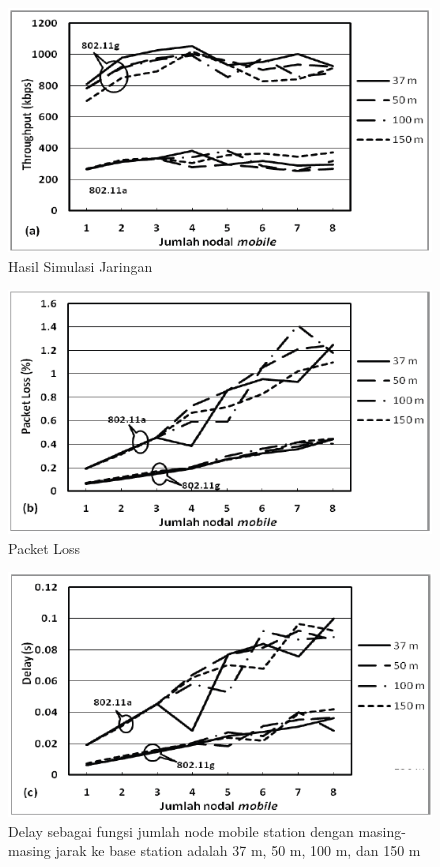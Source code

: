 \documentclass{jtetiproposalskripsi}
\begin{document}
\begin{figure}[ht!]
  \centering
    \includegraphics{gambar/2a}
    \caption{Hasil Simulasi Jaringan}
    \label{Hasil Simulasi Jaringan}
\end{figure}
\vspace{-0.5cm}
\begin{figure}[ht!]
  \centering
    \includegraphics{gambar/2b}
    \caption{Packet Loss}
    \label{Packet Loss}
\end{figure}
\vspace{-0.5cm}
\begin{figure}[ht!]
  \centering
    \includegraphics{gambar/2c}
    \caption{Delay sebagai fungsi jumlah node mobile station dengan masing-masing jarak ke base station adalah 37 m, 50 m, 100 m, dan 150 m}
    \label{Delay}
\end{figure}
\end{document}
